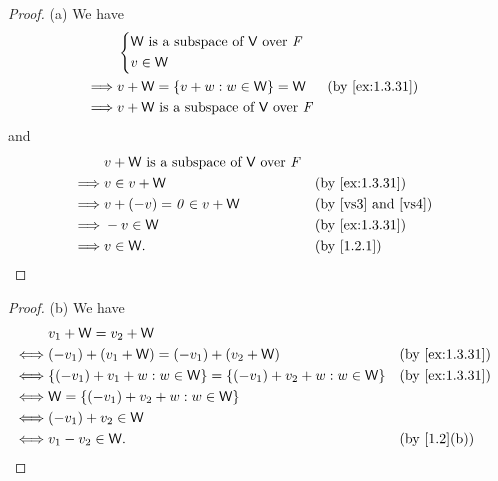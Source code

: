 \begin{proof}{(a)}
  We have
  \begin{align*}
             & \begin{dcases}
      \W \text{ is a subspace of } \V \text{ over } \F \\
      v \in \W
    \end{dcases}                                                            \\
    \implies & v + \W = \set{v + w : w \in \W} = \W                 &  & \text{(by \cref{ex:1.3.31})} \\
    \implies & v + \W \text{ is a subspace of } \V \text{ over } \F
  \end{align*}
  and
  \begin{align*}
             & v + \W \text{ is a subspace of } \V \text{ over } \F                                          \\
    \implies & v \in v + \W                                         &  & \text{(by \cref{ex:1.3.31})}        \\
    \implies & v + (-v) = \zv \in v + \W                            &  & \text{(by \ref{vs3} and \ref{vs4})} \\
    \implies & -v \in \W                                            &  & \text{(by \cref{ex:1.3.31})}        \\
    \implies & v \in \W.                                            &  & \text{(by \cref{1.2.1})}
  \end{align*}
\end{proof}

\begin{proof}{(b)}
  We have
  \begin{align*}
         & v_1 + \W = v_2 + \W                                                                                     \\
    \iff & (-v_1) + (v_1 + \W) = (-v_1) + (v_2 + \W)                             &  & \text{(by \cref{ex:1.3.31})} \\
    \iff & \set{(-v_1) + v_1 + w : w \in \W} = \set{(-v_1) + v_2 + w : w \in \W} &  & \text{(by \cref{ex:1.3.31})} \\
    \iff & \W = \set{(-v_1) + v_2 + w : w \in \W}                                                                  \\
    \iff & (-v_1) + v_2 \in \W                                                                                     \\
    \iff & v_1 - v_2 \in \W.                                                     &  & \text{(by \cref{1.2}(b))}
  \end{align*}
\end{proof}

